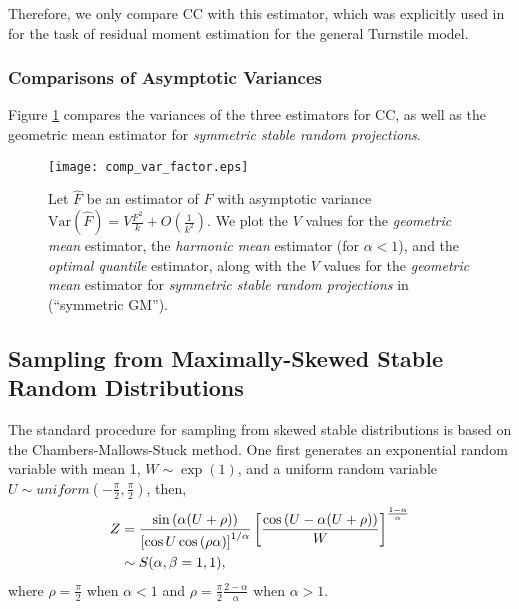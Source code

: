\documentclass{sig-alternate}
\begin{document}
Therefore, we only compare CC with this estimator, which was explicitly used  in \cite{Article:Harvey_entropy_arXiv08,Proc:Harvey_FOCS08}  for the task of residual moment estimation for the general Turnstile model. 

\subsubsection{Comparisons of Asymptotic Variances}

Figure \ref{fig_comp_var_factor} compares the variances of the three estimators for CC, as well as the geometric mean estimator for {\em symmetric stable random projections}.

\begin{figure}[h]
\begin{center}
\texttt{[image: comp\_var\_factor.eps]}
\end{center}
\vspace{-0.3in}
\caption{Let $\hat{F}$ be an estimator of $F$ with asymptotic variance $\text{Var}\left(\hat{F}\right) = V\frac{F^2}{k} + O\left(\frac{1}{k^2}\right)$. We plot the $V$ values for the {\em geometric mean} estimator,  the {\em harmonic mean} estimator (for $\alpha<1$), and the {\em optimal quantile} estimator, along with the $V$ values for the {\em geometric mean} estimator for {\em symmetric stable random projections} in \cite{Proc:Li_SODA08} (``symmetric GM'').
}\label{fig_comp_var_factor}
\end{figure}


\subsection{Sampling from Maximally-Skewed Stable Random Distributions}


The standard procedure for sampling from skewed stable distributions is based on the Chambers-Mallows-Stuck method\cite{Article:Chambers_JASA76}. One first generates an exponential random variable with mean 1, $W \sim \exp(1)$,  and a uniform random variable $U \sim uniform \left(-\frac{\pi}{2}, \frac{\pi}{2}\right)$, then,
\begin{align}\notag
Z &= \frac{\sin\left(\alpha(U+\rho)\right)}{\left[\cos U \cos\left(\rho \alpha\right)
\right]^{1/\alpha}} \left[\frac{\cos\left( U - \alpha(U + \rho)\right)}{W}
\right]^{\frac{1-\alpha}{\alpha}}\\\label{eqn_sampling_skewed}
& \sim S(\alpha,\beta=1,1),
\end{align}
where $\rho = \frac{\pi}{2}$ when $\alpha<1$ and $\rho = \frac{\pi}{2}\frac{2-\alpha}{\alpha}$ when $\alpha>1$. \\
\end{document}
